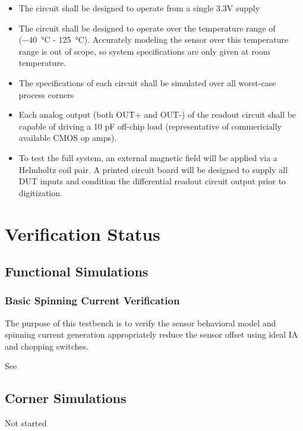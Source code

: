 \documentclass{article}
\begin{document}
\begin{itemize}
    \item{The circuit shall be designed to operate from a single 3.3V supply}
    \item{The circuit shall be designed to operate over the temperature range of (\SI{-40}{\degreeCelsius} - \SI{125}{\degreeCelsius}). 
    Accurately modeling the sensor over this temperature range is out of scope, so system specifications are only given at room temperature.}
    \item{The specifications of each circuit shall be simulated over all worst-case process corners}
    \item{Each analog output (both OUT+ and OUT-) of the 
    readout circuit shall be capable of driving a 
    10 pF off-chip load (representative of commericially available 
    CMOS op amps).}
    \item{
    To test the full system, an external magnetic 
    field will be applied via a Helmholtz coil pair. 
    A printed circuit board will be designed to supply 
    all DUT inputs and condition the differential 
    readout circuit output prior to digitization.
    }
\end{itemize}

\newpage

\section{Verification Status}

\subsection{Functional Simulations}

\subsubsection*{Basic Spinning Current Verification}

The purpose of this testbench is to verify the sensor behavioral model and spinning current generation
appropriately reduce the sensor offset using ideal IA and chopping switches. 

See 

\subsection{Corner Simulations}

Not started
\end{document}
